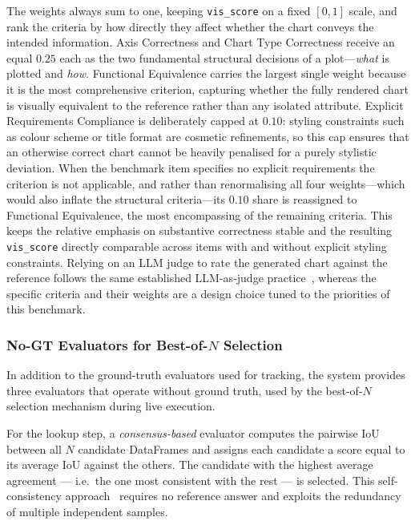 \noindent The weights always sum to one, keeping \texttt{vis\_score} on a fixed
$[0,1]$ scale, and rank the criteria by how directly they affect whether the
chart conveys the intended information. Axis Correctness and Chart Type
Correctness receive an equal $0.25$ each as the two fundamental structural
decisions of a plot---\emph{what} is plotted and \emph{how}. Functional
Equivalence carries the largest single weight because it is the most
comprehensive criterion, capturing whether the fully rendered chart is visually
equivalent to the reference rather than any isolated attribute. Explicit
Requirements Compliance is deliberately capped at $0.10$: styling constraints
such as colour scheme or title format are cosmetic refinements, so this cap
ensures that an otherwise correct chart cannot be heavily penalised for a purely
stylistic deviation. When the benchmark item specifies no explicit requirements
the criterion is not applicable, and rather than renormalising all four
weights---which would also inflate the structural criteria---its $0.10$ share is
reassigned to Functional Equivalence, the most encompassing of the remaining
criteria. This keeps the relative emphasis on substantive correctness stable and
the resulting \texttt{vis\_score} directly comparable across items with and
without explicit styling constraints. Relying on an LLM judge to rate the
generated chart against the reference follows the same established
LLM-as-judge practice~\cite{zheng2023judging}, whereas the specific criteria
and their weights are a design choice tuned to the priorities of this
benchmark.

\subsubsection{No-GT Evaluators for Best-of-\texorpdfstring{$N$}{N} Selection}

In addition to the ground-truth evaluators used for tracking, the system provides
three evaluators that operate without ground truth, used by the best-of-$N$
selection mechanism during live execution.

For the lookup step, a \textit{consensus-based} evaluator computes the pairwise
IoU between all $N$ candidate DataFrames and assigns each candidate a score equal
to its average IoU against the others. The candidate with the highest average
agreement — i.e.\ the one most consistent with the rest — is selected. This
self-consistency approach~\cite{wang2023selfconsistency} requires no reference
answer and exploits the redundancy of multiple independent samples.

